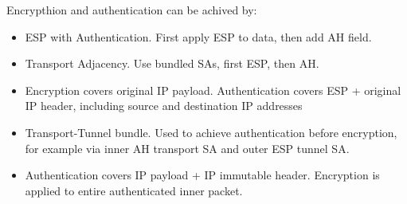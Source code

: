 Encrypthion and authentication can be achived by: 
\begin{itemize}
    \item ESP with Authentication. First apply ESP to data, then add AH field.
    \item Transport Adjacency. Use bundled SAs, first ESP, then AH.
    \item Encryption covers original IP payload. Authentication covers ESP + original IP
header, including source and destination IP addresses
    \item Transport-Tunnel bundle. Used to achieve authentication before encryption, for
example via inner AH transport SA and outer ESP tunnel SA.
    \item Authentication covers IP payload + IP immutable header. Encryption is applied
to entire authenticated inner packet.
\end{itemize}